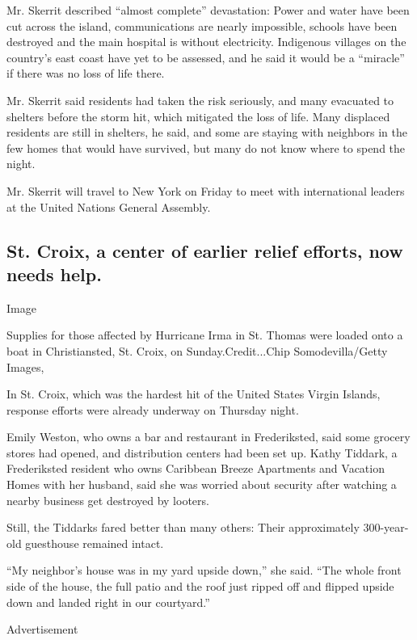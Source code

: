 Mr. Skerrit described ``almost complete'' devastation: Power and water
have been cut across the island, communications are nearly impossible,
schools have been destroyed and the main hospital is without
electricity. Indigenous villages on the country's east coast have yet to
be assessed, and he said it would be a ``miracle'' if there was no loss
of life there.

Mr. Skerrit said residents had taken the risk seriously, and many
evacuated to shelters before the storm hit, which mitigated the loss of
life. Many displaced residents are still in shelters, he said, and some
are staying with neighbors in the few homes that would have survived,
but many do not know where to spend the night.

Mr. Skerrit will travel to New York on Friday to meet with international
leaders at the United Nations General Assembly.

\hypertarget{st-croix-a-center-of-earlier-relief-efforts-now-needs-help}{%
\subsection{St. Croix, a center of earlier relief efforts, now needs
help.}\label{st-croix-a-center-of-earlier-relief-efforts-now-needs-help}}

Image

Supplies for those affected by Hurricane Irma in St. Thomas were loaded
onto a boat in Christiansted, St. Croix, on Sunday.Credit...Chip
Somodevilla/Getty Images,

In St. Croix, which was the hardest hit of the United States Virgin
Islands, response efforts were already underway on Thursday night.

Emily Weston, who owns a bar and restaurant in Frederiksted, said some
grocery stores had opened, and distribution centers had been set up.
Kathy Tiddark, a Frederiksted resident who owns Caribbean Breeze
Apartments and Vacation Homes with her husband, said she was worried
about security after watching a nearby business get destroyed by
looters.

Still, the Tiddarks fared better than many others: Their approximately
300-year-old guesthouse remained intact.

``My neighbor's house was in my yard upside down,'' she said. ``The
whole front side of the house, the full patio and the roof just ripped
off and flipped upside down and landed right in our courtyard.''

Advertisement

